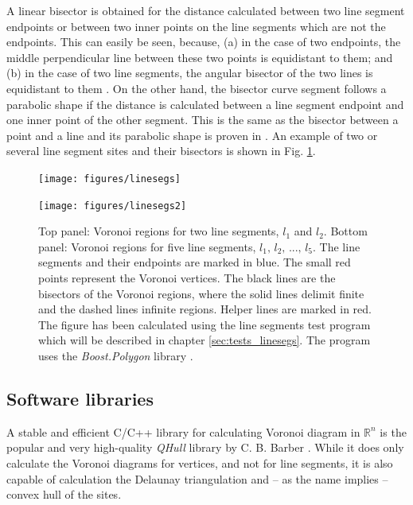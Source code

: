 A linear bisector is obtained for the distance calculated between two line segment endpoints or between two inner 
points on the line segments which are not the endpoints.
This can easily be seen, because, (a) in the case of two endpoints, the middle perpendicular line between these 
two points is equidistant to them; and (b) in the case of two line segments, the angular bisector of the two lines is
equidistant to them \cite[pp. 243-244]{FUH_geo2020}.
On the other hand, the bisector curve segment follows a parabolic shape if the distance is calculated 
between a line segment endpoint and one inner point of the other segment. This is the same as the bisector between
a point and a line and its parabolic shape is proven in \cite[pp. 260-261]{FUH_geo2020}.
An example of two or several line segment sites and their bisectors is shown in Fig. \ref{fig:linesegs_voro}.

\begin{figure}[h]
	\begin{minipage}{1 \textwidth}
		\begin{center}
			\texttt{[image: figures/linesegs]}
		\end{center}
		\vspace{0.5cm}
	\end{minipage}
	\begin{minipage}{1 \textwidth}
		\vspace{0.25cm}
		\begin{center}
			\texttt{[image: figures/linesegs2]}
		\end{center}
	\end{minipage}
	\caption[Voronoi diagrams for line segments.]{
		Top panel: Voronoi regions for two line segments, $l_1$ and $l_2$.
		Bottom panel: Voronoi regions for five line segments, $l_1,\, l_2,\, ...,\, l_5$.
		The line segments and their endpoints are marked in blue. The small red points represent the Voronoi vertices.
		The black lines are the bisectors of the Voronoi regions, where the solid lines delimit finite and the dashed lines
		infinite regions. Helper lines are marked in red. The figure has been calculated using the line segments
		test program which will be described in chapter \ref{sec:tests_linesegs}. The program uses 
		the \textit{Boost.Polygon} library \cite{web_boost_polygon_voronoi}.
		\label{fig:linesegs_voro}}
\end{figure}


\subsection{Software libraries}
A stable and efficient C/C++ library for calculating Voronoi diagram in $\mathbb{R}^n$ is the popular and very 
high-quality \textit{QHull} library by C. B. Barber \cite{web_qhull}. While it does only calculate 
the Voronoi diagrams for vertices, and not for line segments, it is also capable of calculation the Delaunay
triangulation and -- as the name implies -- convex hull of the sites.

